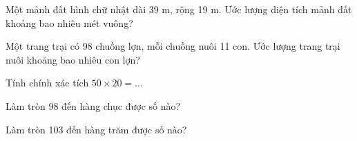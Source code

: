 \begin{ex}
Một mảnh đất hình chữ nhật dài 39 m, rộng 19 m. Ước lượng diện tích mảnh đất khoảng bao nhiêu mét vuông?
\end{ex}

\begin{ex}
Một trang trại có 98 chuồng lợn, mỗi chuồng nuôi 11 con. Ước lượng trang trại nuôi khoảng bao nhiêu con lợn?
\end{ex}

\begin{ex}
Tính chính xác tích $50 \times 20 = \dots$
\end{ex}

\begin{ex}
Làm tròn 98 đến hàng chục được số nào?
\end{ex}

\begin{ex}
Làm tròn 103 đến hàng trăm được số nào?
\end{ex}
